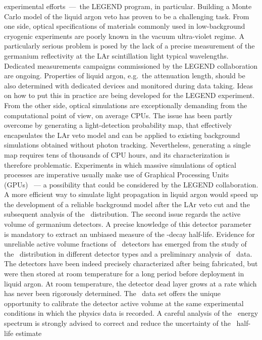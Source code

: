 experimental efforts~---~the LEGEND program, in particular. Building a Monte Carlo model
of the liquid argon veto has proven to be a challenging task. From one side, optical
specifications of materials commonly used in low-background cryogenic experiments are
poorly known in the vacuum ultra-violet regime. A particularly serious problem is posed by
the lack of a precise measurement of the germanium reflectivity at the LAr scintillation
light typical wavelengths. Dedicated measurements campaigns commissioned by the LEGEND
collaboration are ongoing.  Properties of liquid argon, e.g.~the attenuation length,
should be also determined with dedicated devices and monitored during data taking. Ideas
on how to put this in practice are being developed for the LEGEND experiment. From the
other side, optical simulations are exceptionally demanding from the computational point
of view, on average CPUs. The issue has been partly overcome by generating a
light-detection probability map, that effectively encapsulates the LAr veto model and can
be applied to existing background simulations obtained without photon tracking.
Nevertheless, generating a single map requires tens of thousands of CPU hours, and its
characterization is therefore problematic. Experiments in which massive simulations of
optical processes are imperative usually make use of Graphical Processing Units
(GPUs)~\cite{Merck2012, Blyth2019} --- a possibility that could be considered by the
LEGEND collaboration. A more efficient way to simulate light propagation in liquid argon
would speed up the development of a reliable background model after the LAr veto cut and
the subsequent analysis of the \nnbb\ distribution.
\newpar
The second issue regards the active volume of germanium detectors. A precise knowledge of
this detector parameter is mandatory to extract an unbiased measure of the \nnbb-decay
half-life. Evidence for unreliable active volume fractions of \bege\ detectors has emerged
from the study of the \nnbb\ distribution in different detector types and a preliminary
analysis of \Arl\ data.  The detectors have been indeed precisely characterized after
being fabricated, but were then stored at room temperature for a long period before
deployment in liquid argon. At room temperature, the detector dead layer grows at a rate
which has never been rigorously determined. The \Arl\ data set offers the unique
opportunity to calibrate the detector active volume at the same experimental conditions in
which the physics data is recorded. A careful analysis of the \Arl\ energy spectrum is
strongly advised to correct and reduce the uncertainty of the \nnbb\ half-life estimate
